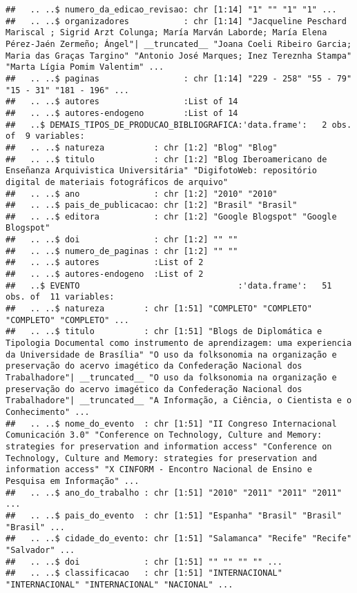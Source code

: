\documentclass[]{article}
\begin{document}
\begin{verbatim}
##   .. ..$ numero_da_edicao_revisao: chr [1:14] "1" "" "1" "1" ...
##   .. ..$ organizadores           : chr [1:14] "Jacqueline Peschard Mariscal ; Sigrid Arzt Colunga; María Marván Laborde; María Elena Pérez-Jaén Zermeño; Ángel"| __truncated__ "Joana Coeli Ribeiro Garcia; Maria das Graças Targino" "Antonio José Marques; Inez Tereznha Stampa" "Marta Lígia Pomim Valentim" ...
##   .. ..$ paginas                 : chr [1:14] "229 - 258" "55 - 79" "15 - 31" "181 - 196" ...
##   .. ..$ autores                 :List of 14
##   .. ..$ autores-endogeno        :List of 14
##   ..$ DEMAIS_TIPOS_DE_PRODUCAO_BIBLIOGRAFICA:'data.frame':   2 obs. of  9 variables:
##   .. ..$ natureza          : chr [1:2] "Blog" "Blog"
##   .. ..$ titulo            : chr [1:2] "Blog Iberoamericano de Enseñanza Arquivistica Universitária" "DigifotoWeb: repositório digital de materiais fotográficos de arquivo"
##   .. ..$ ano               : chr [1:2] "2010" "2010"
##   .. ..$ pais_de_publicacao: chr [1:2] "Brasil" "Brasil"
##   .. ..$ editora           : chr [1:2] "Google Blogspot" "Google Blogspot"
##   .. ..$ doi               : chr [1:2] "" ""
##   .. ..$ numero_de_paginas : chr [1:2] "" ""
##   .. ..$ autores           :List of 2
##   .. ..$ autores-endogeno  :List of 2
##   ..$ EVENTO                                :'data.frame':   51 obs. of  11 variables:
##   .. ..$ natureza        : chr [1:51] "COMPLETO" "COMPLETO" "COMPLETO" "COMPLETO" ...
##   .. ..$ titulo          : chr [1:51] "Blogs de Diplomática e Tipologia Documental como instrumento de aprendizagem: uma experiencia da Universidade de Brasília" "O uso da folksonomia na organização e preservação do acervo imagético da Confederação Nacional dos Trabalhadore"| __truncated__ "O uso da folksonomia na organização e preservação do acervo imagético da Confederação Nacional dos Trabalhadore"| __truncated__ "A Informação, a Ciência, o Cientista e o Conhecimento" ...
##   .. ..$ nome_do_evento  : chr [1:51] "II Congreso Internacional Comunicación 3.0" "Conference on Technology, Culture and Memory: strategies for preservation and information access" "Conference on Technology, Culture and Memory: strategies for preservation and information access" "X CINFORM - Encontro Nacional de Ensino e Pesquisa em Informação" ...
##   .. ..$ ano_do_trabalho : chr [1:51] "2010" "2011" "2011" "2011" ...
##   .. ..$ pais_do_evento  : chr [1:51] "Espanha" "Brasil" "Brasil" "Brasil" ...
##   .. ..$ cidade_do_evento: chr [1:51] "Salamanca" "Recife" "Recife" "Salvador" ...
##   .. ..$ doi             : chr [1:51] "" "" "" "" ...
##   .. ..$ classificacao   : chr [1:51] "INTERNACIONAL" "INTERNACIONAL" "INTERNACIONAL" "NACIONAL" ...

\end{verbatim}
\end{document}
